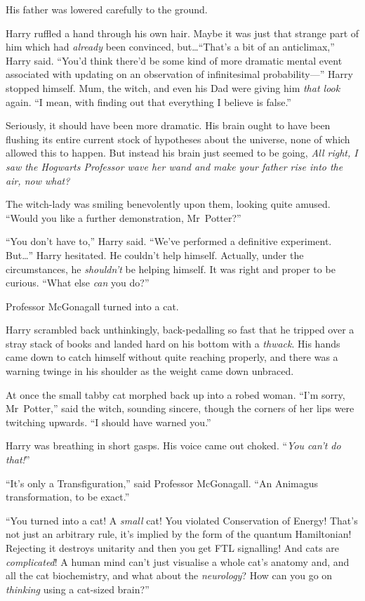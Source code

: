 His father was lowered carefully to the ground.

Harry ruffled a hand through his own hair.
Maybe it was just that strange part of him which had \emph{already} been convinced, but…“That’s a bit of an anticlimax,” Harry said.
“You’d think there’d be some kind of more dramatic mental event associated with updating on an observation of infinitesimal probability—” Harry stopped himself.
Mum, the witch, and even his Dad were giving him \emph{that look} again.
“I mean, with finding out that everything I believe is false.”

Seriously, it should have been more dramatic.
His brain ought to have been flushing its entire current stock of hypotheses about the universe, none of which allowed this to happen.
But instead his brain just seemed to be going, \emph{All right, I saw the Hogwarts Professor wave her wand and make your father rise into the air, now what?}

The witch-lady was smiling benevolently upon them, looking quite amused.
“Would you like a further demonstration, Mr~Potter?”

“You don’t have to,” Harry said.
“We’ve performed a definitive experiment.
But…” Harry hesitated.
He couldn’t help himself.
Actually, under the circumstances, he \emph{shouldn’t} be helping himself.
It was right and proper to be curious.
“What else \emph{can} you do?”

Professor McGonagall turned into a cat.

Harry scrambled back unthinkingly, back-pedalling so fast that he tripped over a stray stack of books and landed hard on his bottom with a \emph{thwack}.
His hands came down to catch himself without quite reaching properly, and there was a warning twinge in his shoulder as the weight came down unbraced.

At once the small tabby cat morphed back up into a robed woman.
“I’m sorry, Mr~Potter,” said the witch, sounding sincere, though the corners of her lips were twitching upwards.
“I should have warned you.”

Harry was breathing in short gasps.
His voice came out choked.
“\emph{You can’t \emph{do} that!}”

“It’s only a Transfiguration,” said Professor McGonagall.
“An Animagus transformation, to be exact.”

“You turned into a cat!
A \emph{small} cat!
You violated Conservation of Energy!
That’s not just an arbitrary rule, it’s implied by the form of the quantum Hamiltonian!
Rejecting it destroys unitarity and then you get FTL signalling!
And cats are \emph{complicated}!
A human mind can’t just visualise a whole cat’s anatomy and, and all the cat biochemistry, and what about the \emph{neurology}?
How can you go on \emph{thinking} using a cat-sized brain?”

